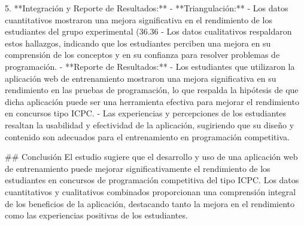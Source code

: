 \begin{markdown}
5. **Integración y Reporte de Resultados:**
   - **Triangulación:**
     - Los datos cuantitativos mostraron una mejora significativa en el rendimiento de los estudiantes del grupo experimental (36.36%
     - Los datos cualitativos respaldaron estos hallazgos, indicando que los estudiantes perciben una mejora en su comprensión de los conceptos y en su confianza para resolver problemas de programación.
   - **Reporte de Resultados:**
     - Los estudiantes que utilizaron la aplicación web de entrenamiento mostraron una mejora significativa en su rendimiento en las pruebas de programación, lo que respalda la hipótesis de que dicha aplicación puede ser una herramienta efectiva para mejorar el rendimiento en concursos tipo ICPC.
     - Las experiencias y percepciones de los estudiantes resaltan la usabilidad y efectividad de la aplicación, sugiriendo que su diseño y contenido son adecuados para el entrenamiento en programación competitiva.

## Conclusión
El estudio sugiere que el desarrollo y uso de una aplicación web de entrenamiento puede mejorar significativamente el rendimiento de los estudiantes en concursos de programación competitiva del tipo ICPC. Los datos cuantitativos y cualitativos combinados proporcionan una comprensión integral de los beneficios de la aplicación, destacando tanto la mejora en el rendimiento como las experiencias positivas de los estudiantes.
\end{markdown}








